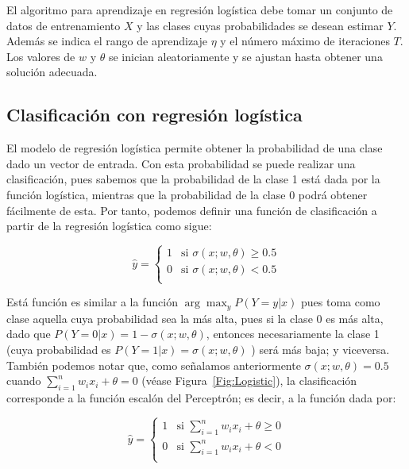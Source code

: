 El algoritmo para aprendizaje en regresión logística debe tomar un conjunto de datos de entrenamiento $X$ y las clases cuyas probabilidades se desean estimar $Y$. Además se indica el rango de aprendizaje $\eta$ y el número máximo de iteraciones $T$. Los valores de $w$ y $\theta$ se inician aleatoriamente y se ajustan hasta obtener una solución adecuada.


\subsection{Clasificación con regresión logística}

El modelo de regresión logística permite obtener la probabilidad de una clase dado un vector de entrada. Con esta probabilidad se puede realizar una clasificación, pues sabemos que la probabilidad de la clase 1 está dada por la función logística, mientras que la probabilidad de la clase 0 podrá obtener fácilmente de esta. Por tanto, podemos definir una función de clasificación a partir de la regresión logística como sigue:

\begin{equation*}
    \hat{y} = \begin{cases} 1 & \text{si } \sigma(x; w, \theta) \geq 0.5 \\
        0 & \text{si } \sigma(x; w, \theta) < 0.5 \\
    \end{cases}
\end{equation*}

Está función es similar a la función $\arg\max_y P(Y=y|x)$ pues toma como clase aquella cuya probabilidad sea la más alta, pues si la clase 0 es más alta, dado que $P(Y=0|x) = 1-\sigma(x; w, \theta)$, entonces necesariamente la clase 1 (cuya probabilidad es $P(Y=1|x) = \sigma(x; w, \theta)$ ) será más baja; y viceversa. También podemos notar que, como señalamos anteriormente $\sigma(x; w, \theta) = 0.5$ cuando $\sum_{i=1}^n w_i x_i + \theta = 0$ (véase Figura~\ref{Fig:Logistic}), la clasificación corresponde a la función escalón del Perceptrón; es decir, a la función dada por:

\begin{equation*}
    \hat{y} = \begin{cases} 1 & \text{si } \sum_{i=1}^n w_i x_i + \theta \geq 0 \\
        0 & \text{si } \sum_{i=1}^n w_i x_i + \theta < 0 \\
    \end{cases}
\end{equation*}

